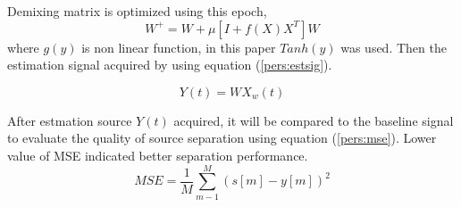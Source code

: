 \documentclass[a4paper]{jpconf}
\begin{document}
Demixing matrix is optimized using this epoch,
\begin{equation}
W^+ = W + \mu\left[I + f(X)X^T\right]W
\end{equation}
where $g(y)$ is non linear function, in this paper $Tanh(y)$ was used. Then the estimation signal acquired by using equation (\ref{pers:estsig}).

\begin{equation}\label{pers:estsig}
Y(t) = WX_w(t)
\end{equation}

After estmation source $Y(t)$ acquired, it will be compared to the baseline signal to evaluate the quality of source separation using equation (\ref{pers:mse}). Lower value of MSE indicated better separation performance.
\begin{equation}\label{pers:mse}
MSE = \frac{1}{M} \sum_{m-1}^M \left(s[m] - y[m]\right)^2
\end{equation}
\end{document}
